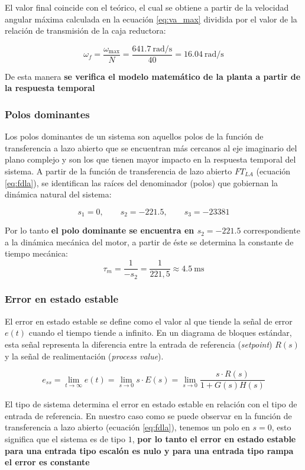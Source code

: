 El valor final coincide con el teórico, el cual se obtiene a partir de la velocidad angular máxima calculada en la ecuación \ref{eq:va_max} dividida por el valor de la relación de transmisión de la caja reductora:

\[
\omega_f =  \frac{\omega_{\text{max}}}{N} = \frac{\SI{641,7}{\radian\per\second}}{40} = \SI{16,04}{\radian\per\second}
\]

De esta manera \textbf{se verifica el modelo matemático de la planta a partir de la respuesta temporal}

\subsubsection{Polos dominantes}
\label{pdominantes}
Los polos dominantes de un sistema son aquellos polos de la función de transferencia a lazo abierto que se encuentran más cercanos al eje imaginario del plano complejo y son los que tienen mayor impacto en la respuesta temporal del sistema.
A partir de la función de transferencia de lazo abierto $FT_{LA}$ (ecuación \ref{eq:fdla}), se identifican las raíces del denominador (polos) que gobiernan la dinámica natural del sistema:

\[
s_1 = \num{0}, \qquad
s_2 = \num{-221,5}, \qquad
s_3 = \num{-23381}
\]

Por lo tanto \textbf{el polo dominante se encuentra en $s_2 = \num{-221,5}$} correspondiente a la dinámica mecánica del motor, a partir de éste se determina la constante de tiempo mecánica:
\[
	\tau_m = \frac{1}{-s_2} = \frac{1}{221,5} \approx \SI{4,5}{\milli\second} 
\]

\subsubsection{Error en estado estable}
\label{ees}


El error en estado estable se define como el valor al que tiende la señal de error $e(t)$ cuando el tiempo tiende a infinito. En un diagrama de bloques estándar, esta señal representa la diferencia entre la entrada de referencia (\textit{setpoint}) $R(s)$ y la señal de realimentación (\textit{process value}).

\[
e_{ss} = \lim_{t \to \infty} e(t) = \lim_{s \to 0} s \cdot E(s) = \lim_{s \to 0} \frac{s \cdot R(s)}{1 + G(s)H(s)}
\]

El tipo de sistema determina el error en estado estable en relación con el tipo de entrada de referencia. En nuestro caso como se puede observar en la función de transferencia a lazo abierto (ecuación \ref{eq:fdla}), tenemos un polo en $s=0$, esto significa que el sistema es de tipo $1$, \textbf{por lo tanto el error en estado estable para una entrada tipo escalón es nulo y para una entrada tipo rampa el error es constante}
